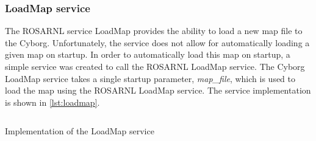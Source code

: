 \documentclass[\rootfolder/main.tex]{subfiles}
\begin{document}
\subsubsection{LoadMap service}

The ROSARNL service LoadMap provides the ability to load a new map file to the Cyborg.
Unfortunately, the service does not allow for automatically loading a given map on startup.
In order to automatically load this map on startup, a simple service was created to call the ROSARNL LoadMap service.
The Cyborg LoadMap service takes a single startup parameter, \emph{map\_file}, which is used to load the map using the ROSARNL LoadMap service.
The service implementation is shown in \cref{lst:loadmap}.

\begin{listing}
    \inputminted{python}{\rootfolder/Chapters/Chapter6/Listings/load_map.py}
    \caption{Implementation of the LoadMap service \label{lst:loadmap}}
\end{listing}
\end{document}
